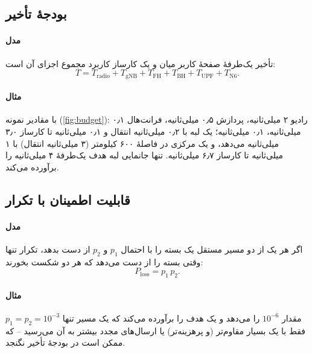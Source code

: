 \documentclass[11pt,a4paper]{article}
\begin{document}
\subsection{بودجهٔ تأخیر}\label{sec:budget}
\paragraph{مدل} تأخیر یک‌طرفهٔ صفحهٔ کاربر میان  و یک کارساز کاربرد مجموع اجزای آن است:
\begin{equation}\label{eq:budget}
  T = T_{\mathrm{radio}} + T_{\mathrm{gNB}} + T_{\mathrm{FH}} + T_{\mathrm{BH}} + T_{\mathrm{UPF}} + T_{\mathrm{N6}} .
\end{equation}
\paragraph{مثال} با مقادیر نمونه (\cref{fig:budget}): رادیو ۲ میلی‌ثانیه، پردازش  ۰٫۵ میلی‌ثانیه، فرانت‌هال ۰٫۱ میلی‌ثانیه،  ۰٫۱
میلی‌ثانیه؛ یک  لبه با ۰٫۲ میلی‌ثانیه انتقال و ۰٫۱ میلی‌ثانیه تا کارساز ۳٫۰ میلی‌ثانیه می‌دهد، و یک  مرکزی در فاصلهٔ ۶۰۰
کیلومتر (۳ میلی‌ثانیه انتقال) با ۱ میلی‌ثانیه تا کارساز ۶٫۷ میلی‌ثانیه. تنها جانمایی لبه هدف یک‌طرفهٔ ۴ میلی‌ثانیه را برآورده می‌کند.

\begin{acnfigure}
  \caption{بودجهٔ تأخیر یک‌طرفهٔ صفحهٔ کاربر با  لبه و مرکزی (مقادیر نمونه، \cref{eq:budget}).}
  \label{fig:budget}
\end{acnfigure}

\subsection{قابلیت اطمینان با تکرار}\label{sec:dup}
\paragraph{مدل} اگر هر یک از دو مسیر مستقل یک بسته را با احتمال $p_1$ و $p_2$ از دست بدهد، تکرار تنها وقتی بسته را از دست می‌دهد که هر دو
شکست بخورند:
\begin{equation}\label{eq:dup}
  P_{\mathrm{loss}} = p_1\,p_2 .
\end{equation}
\paragraph{مثال} $p_1 = p_2 = 10^{-3}$ مقدار $10^{-6}$ را می‌دهد و یک هدف  را برآورده می‌کند که یک مسیر تنها فقط با یک  بسیار
مقاوم‌تر (و پرهزینه‌تر) یا ارسال‌های مجدد بیشتر به آن می‌رسید -- که ممکن است در بودجهٔ تأخیر نگنجد.
\end{document}
